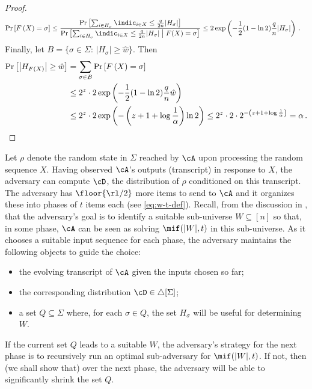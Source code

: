\begin{itemize}
\begin{itemize}
\begin{proof}
\begin{align*}
    \Pr\left[F\left(X\right)=\sigma\right]
    &\le \frac{\Pr\left[\sum_{i\in H_{\sigma}}\indic_{i \in X} \le \frac{q}{2n}|H_{\sigma}|\right]}%
      {\Pr\left[\sum_{i\in H_{\sigma}}\indic_{i \in X} \le \frac{q}{2n}|H_{\sigma}| \bigm| F(X)=\sigma\right]}
    \le 2\exp\left(-\frac{1}{2}(1-\ln 2)\frac{q}{n}|H_{\sigma}|\right) \,.
  \end{align*}
  Finally, let $B = \{\sigma\in\Sigma:\, |H_{\sigma}|\ge\hat{w}\}$. Then
  \begin{align*}
    \Pr\left[\left|H_{F(X)}\right|\ge\hat{w}\right]
    &=\sum_{\sigma\in B}\Pr\left[F\left(X\right)=\sigma\right] \\
    &\le 2^{z}\cdot2\exp\left(-\frac{1}{2}(1-\ln 2)\frac{q}{n}\hat{w}\right) \\
    &\le 2^{z}\cdot2\exp\left(-\left(z+1+\log\frac{1}{\alpha}\right)\ln2\right) 
    \le 2^{z}\cdot2\cdot2^{-\left(z+1+\log\frac{1}{\alpha}\right)}
    = \alpha \,. \qedhere
	\end{align*}
\end{proof}

 Let $\rho$ denote the
random state in $\Sigma$ reached by $\cA$ upon processing the random sequence
$X$. Having observed $\cA$'s outputs (transcript) in response to $X$, the
adversary can compute $\cD$, the distribution of $\rho$ conditioned on this
transcript. The adversary has $\floor{\rl/2}$ more items to send to $\cA$ and
it organizes these into phases of $t$ items each (see \cref{eq:w-t-def}).
Recall, from the discussion in , that the
adversary's goal is to identify a suitable sub-universe $W \subseteq [n]$ so
that, in some phase, $\cA$ can be seen as solving $\mif(|W|,t)$ in this
sub-universe.  As it chooses a suitable input sequence for each phase, the
adversary maintains the following objects to guide the choice:
\begin{itemize}
  \item the evolving transcript of $\cA$ given the inputs chosen so far;
  \item the corresponding distribution $\cD \in \triangle[\Sigma]$;
  \item a set $Q \subseteq \Sigma$ where, for each $\sigma \in Q$, the set
  $H_\sigma$ will be useful for determining $W$.
\end{itemize}
If the current set $Q$ leads to a suitable $W$, the adversary's strategy for
the next phase is to recursively run an optimal sub-adversary for
$\mif(|W|,t)$. If not, then (we shall show that) over the next phase, the
adversary will be able to significantly shrink the set $Q$.


\end{itemize}
\end{itemize}
